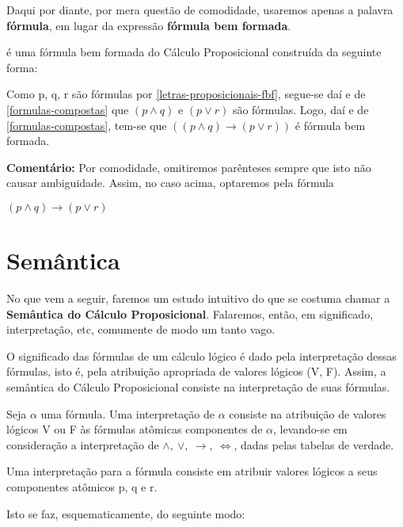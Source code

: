 Daqui por diante, por mera questão de comodidade, usaremos apenas a palavra \textbf{fórmula}, em lugar da expressão \textbf{fórmula bem formada}.

\begin{exemplo}
     é uma fórmula bem formada do Cálculo Proposicional construída da seguinte forma:
\end{exemplo}

Como p, q, r são fórmulas por \ref{letras-proposicionais-fbf}, segue-se daí e de \ref{formulas-compostas} que $(p \land q)$ e $(p \lor r)$ são fórmulas.
Logo, daí e de \ref{formulas-compostas}, tem-se que $((p \land q) \to (p \lor r))$ é fórmula bem formada.

\bigskip

\noindent \textbf{Comentário:} Por comodidade, omitiremos parênteses sempre que isto não causar ambiguidade.
Assim, no caso acima, optaremos pela fórmula


\centerline{$(p \land q) \to (p \lor r)$}

\section{Semântica}
\setcounter{exemplo}{0}
No que vem a seguir, faremos um estudo intuitivo do que se costuma chamar a \textbf{Semântica do Cálculo Proposicional}.
Falaremos, então, em significado, interpretação, etc, comumente de modo um tanto vago.

O significado das fórmulas de um cálculo lógico é dado pela interpretação dessas fórmulas, isto é, pela atribuição apropriada de valores lógicos (V, F).
Assim, a semântica do Cálculo Proposicional consiste na interpretação de suas fórmulas.

Seja $\alpha$ uma fórmula.
Uma interpretação de $\alpha$ consiste na atribuição de valores lógicos V ou F às fórmulas atômicas componentes de $\alpha$, levando-se em consideração a interpretação de $\land,\ \lor,\ \to,\ \iff$, dadas pelas tabelas de verdade.

\begin{exemplo}
    Uma interpretação para a fórmula  consiste em atribuir valores lógicos a seus componentes atômicos p, q e r.
\end{exemplo}
\noindent
Isto se faz, esquematicamente, do seguinte modo:

